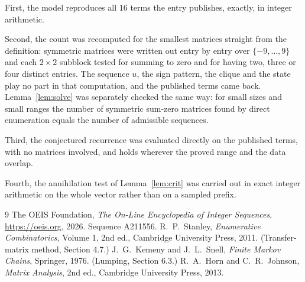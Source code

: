 \documentclass[11pt,a4paper]{article}
\theoremstyle{plain}
\theoremstyle{definition}
\begin{document}
First, the model reproduces all $16$ terms the entry publishes, exactly, in integer
arithmetic.

Second, the count was recomputed for the smallest matrices straight from the definition:
symmetric matrices were written out entry by entry over $\{-9,\dots,9\}$ and each
$2\times2$ subblock tested for summing to zero and for having two, three or four distinct entries. The
sequence $u$, the sign pattern, the clique and the state play no part in that computation, and
the published terms came back. Lemma~\ref{lem:solve} was separately checked the same way: for
small sizes and small ranges the number of symmetric sum-zero matrices found by direct
enumeration equals the number of admissible sequences.

Third, the conjectured recurrence was evaluated directly on the published terms, with no
matrices involved, and holds wherever the proved range and the data overlap.

Fourth, the annihilation test of Lemma~\ref{lem:crit} was carried out in exact integer
arithmetic on the whole vector rather than on a sampled prefix.

\begin{thebibliography}{9}
 The OEIS Foundation, \emph{The On-Line Encyclopedia of Integer
Sequences}, \url{https://oeis.org}, 2026. Sequence A211556.
 R.~P.~Stanley, \emph{Enumerative Combinatorics}, Volume 1, 2nd ed.,
Cambridge University Press, 2011. (Transfer-matrix method, Section 4.7.)
 J.~G.~Kemeny and J.~L.~Snell, \emph{Finite Markov Chains}, Springer, 1976.
(Lumping, Section 6.3.)
 R.~A.~Horn and C.~R.~Johnson, \emph{Matrix Analysis}, 2nd ed., Cambridge
University Press, 2013.
\end{thebibliography}
\end{document}

